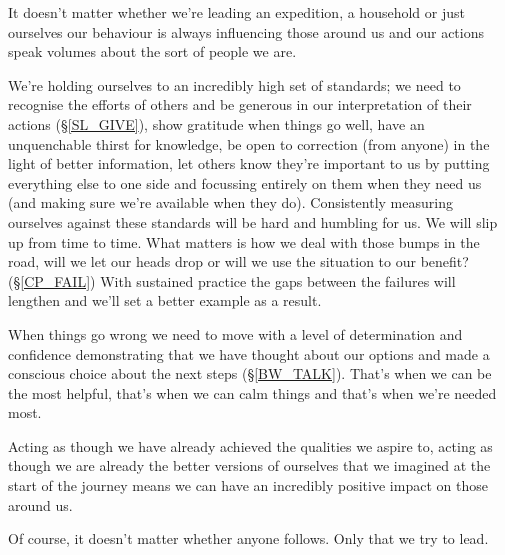 \cleardoublepage
{\small

It doesn't matter whether we're leading an expedition, a household or just ourselves our behaviour is always influencing those around us and our actions speak volumes about the sort of people we are.

We're holding ourselves to an incredibly high set of standards; we need to recognise the efforts of others and be generous in our interpretation of their actions (\S \ref{SL_GIVE}), show gratitude when things go well, have an unquenchable thirst for knowledge, be open to correction (from anyone) in the light of better information, let others know they're important to us by putting everything else to one side and focussing entirely on them when they need us (and making sure we're available when they do). Consistently measuring ourselves against these standards will be hard and humbling for us. We will slip up from time to time. What matters is how we deal with those bumps in the road, will we let our heads drop or will we use the situation to our benefit? (\S \ref{CP_FAIL}) With sustained practice the gaps between the failures will lengthen and we'll set a better example as a result.

When things go wrong we need to move with a level of determination and confidence demonstrating that we have thought about our options and made a conscious choice about the next steps (\S \ref{BW_TALK}). That's when we can be the most helpful, that's when we can calm things and that's when we're needed most.

Acting as though we have already achieved the qualities we aspire to, acting as though we are already the better versions of ourselves that we imagined at the start of the journey means we can have an incredibly positive impact on those around us.

Of course, it doesn't matter whether anyone follows. Only that we try to lead.

}
\clearpage
